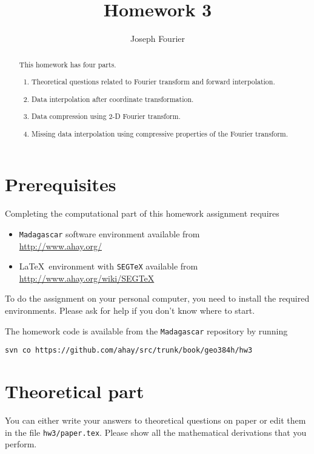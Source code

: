 \author{Joseph Fourier}
\title{Homework 3}

\begin{abstract}
  This homework has four parts. 
  \begin{enumerate}
  \item Theoretical questions related to Fourier transform and forward
    interpolation.
  \item Data interpolation after coordinate transformation.
  \item Data compression using 2-D Fourier transform.
  \item Missing data interpolation using compressive properties of the
    Fourier transform.
  \end{enumerate}
\end{abstract}

\section{Prerequisites}

Completing the computational part of this homework assignment requires
\begin{itemize}
\item \texttt{Madagascar} software environment available from \\
\url{http://www.ahay.org/}
\item \LaTeX\ environment with \texttt{SEGTeX} available from \\ 
\url{http://www.ahay.org/wiki/SEGTeX}
\end{itemize}
To do the assignment on your personal computer, you need to install
the required environments. Please ask for help if you don't know where
to start.

The homework code is available from the \texttt{Madagascar} repository
by running
\begin{verbatim}
svn co https://github.com/ahay/src/trunk/book/geo384h/hw3
\end{verbatim}

\section{Theoretical part}

You can either write your answers to theoretical questions on paper or
edit them in the file \texttt{hw3/paper.tex}. Please show all the
mathematical derivations that you perform.

